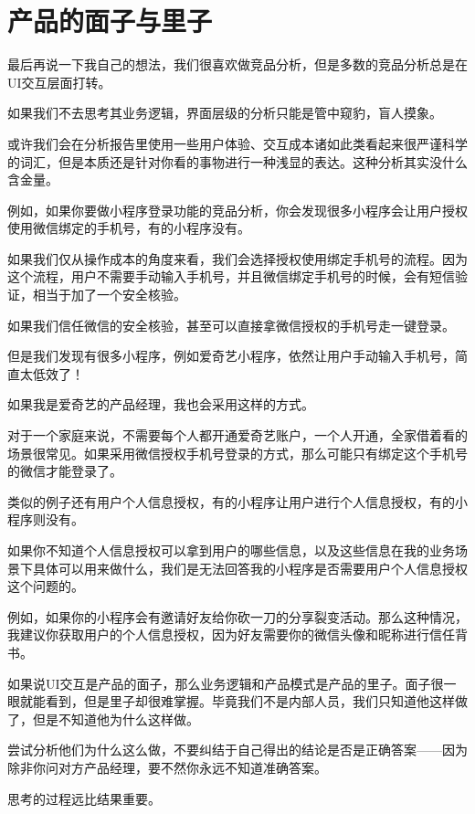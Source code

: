 \documentclass[12pt]{article}
\begin{document}
\section{产品的面子与里子}
最后再说一下我自己的想法，我们很喜欢做竞品分析，但是多数的竞品分析总是在UI交互层面打转。

如果我们不去思考其业务逻辑，界面层级的分析只能是管中窥豹，盲人摸象。

或许我们会在分析报告里使用一些用户体验、交互成本诸如此类看起来很严谨科学的词汇，但是本质还是针对你看的事物进行一种浅显的表达。这种分析其实没什么含金量。

例如，如果你要做小程序登录功能的竞品分析，你会发现很多小程序会让用户授权使用微信绑定的手机号，有的小程序没有。

如果我们仅从操作成本的角度来看，我们会选择授权使用绑定手机号的流程。因为这个流程，用户不需要手动输入手机号，并且微信绑定手机号的时候，会有短信验证，相当于加了一个安全核验。

如果我们信任微信的安全核验，甚至可以直接拿微信授权的手机号走一键登录。

但是我们发现有很多小程序，例如爱奇艺小程序，依然让用户手动输入手机号，简直太低效了！

如果我是爱奇艺的产品经理，我也会采用这样的方式。

对于一个家庭来说，不需要每个人都开通爱奇艺账户，一个人开通，全家借着看的场景很常见。如果采用微信授权手机号登录的方式，那么可能只有绑定这个手机号的微信才能登录了。

类似的例子还有用户个人信息授权，有的小程序让用户进行个人信息授权，有的小程序则没有。

如果你不知道个人信息授权可以拿到用户的哪些信息，以及这些信息在我的业务场景下具体可以用来做什么，我们是无法回答我的小程序是否需要用户个人信息授权这个问题的。

例如，如果你的小程序会有邀请好友给你砍一刀的分享裂变活动。那么这种情况，我建议你获取用户的个人信息授权，因为好友需要你的微信头像和昵称进行信任背书。

如果说UI交互是产品的面子，那么业务逻辑和产品模式是产品的里子。面子很一眼就能看到，但是里子却很难掌握。毕竟我们不是内部人员，我们只知道他这样做了，但是不知道他为什么这样做。

尝试分析他们为什么这么做，不要纠结于自己得出的结论是否是正确答案——因为除非你问对方产品经理，要不然你永远不知道准确答案。

思考的过程远比结果重要。


\end{document}
